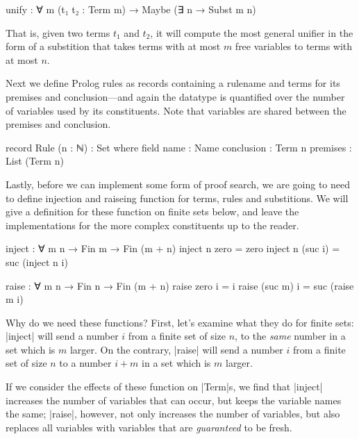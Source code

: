 \documentclass[preprint]{sigplanconf}
\begin{document}
\begin{spec}
  unify : ∀ {m} (t₁ t₂ : Term m) → Maybe (∃ n → Subst m n)
\end{spec}

That is, given two terms $t_1$ and $t_2$, it will compute the most general
unifier in the form of a substition that takes terms with at most $m$ free
variables to terms with at most $n$.


Next we define Prolog rules as records containing a rulename and terms for its
premises and conclusion---and again the datatype is quantified over the number of
variables used by its constituents. Note that variables are shared between the
premises and conclusion. 

\begin{code}
  record Rule (n : ℕ) : Set where
    field
      name        : Name
      conclusion  : Term n
      premises    : List (Term n)
\end{code}


Lastly, before we can implement some form of proof search, we are going to need
to define injection and raiseing function for terms, rules and substitions.
We will give a definition for these function on finite sets below, and leave the
implementations for the more complex constituents up to the reader.

\begin{code}
  inject : ∀ {m} n → Fin m → Fin (m + n)
  inject n  zero    = zero
  inject n (suc i)  = suc (inject n i)

  raise : ∀ m {n} → Fin n → Fin (m + n)
  raise  zero   i  = i
  raise (suc m) i  = suc (raise m i)
\end{code}

Why do we need these functions? First, let's examine what they do for finite sets:
|inject| will send a number $i$ from a finite set of size $n$, to the \emph{same}
number in a set which is $m$ larger.
On the contrary, |raise| will send a number $i$ from a finite set of size $n$ to a
number $i + m$ in a set which is $m$ larger.

If we consider the effects of these function on |Term|s, we find that |inject|
increases the number of variables that can occur, but keeps the variable names
the same; |raise|, however, not only increases the number of variables, but also
replaces all variables with variables that are \emph{guaranteed} to be fresh.
\end{document}
